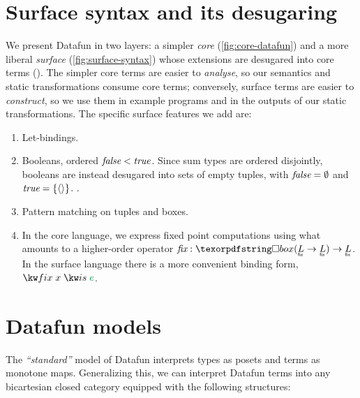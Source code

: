 \section{Surface syntax and its desugaring}
\label{sec:syntax}

We present Datafun in two layers: a simpler \emph{core}
(\cref{fig:core-datafun}) and a more liberal \emph{surface}
(\cref{fig:surface-syntax}) whose extensions are desugared into core terms
().
%
The simpler core terms are easier to \emph{analyse}, so our semantics and static
transformations consume core terms; conversely, surface terms are easier to
\emph{construct}, so we use them in example programs and in the outputs of our
static transformations.
%
The specific surface features we add are:

\begin{enumerate}
\item Let-bindings.

\item Booleans, ordered $\textit{false} < \textit{true}$. Since sum types are ordered
  disjointly, booleans are instead desugared into sets of empty tuples, with
  $\textit{false} = \emptyset$ and $\textit{true} = \{{\langle{}\rangle}\}$. .

\item Pattern matching on tuples and boxes. 


\item In the core language, we express fixed point computations using what
  amounts to a higher-order operator $\prim{fix} : \iso{(\fixt L \to \fixt L)}
  \to \fixt L$. In the surface language there is a more convenient binding form,
  $\efixisd x e$.

\end{enumerate}


\section{Datafun models}
\label{sec:datafun-models}

The \emph{``standard''} model of Datafun interprets types as posets and terms as
monotone maps. Generalizing this, we can interpret Datafun terms into any
bicartesian closed category \catC{} equipped with the following structures:


